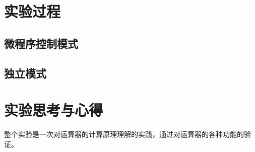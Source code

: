 \documentclass[a4paper]{article}
\begin{document}
\section{实验过程}
\subsection{微程序控制模式}

\subsection{独立模式}

\section{实验思考与心得}
整个实验是一次对运算器的计算原理理解的实践，通过对运算器的各种功能的验证。
\end{document}
